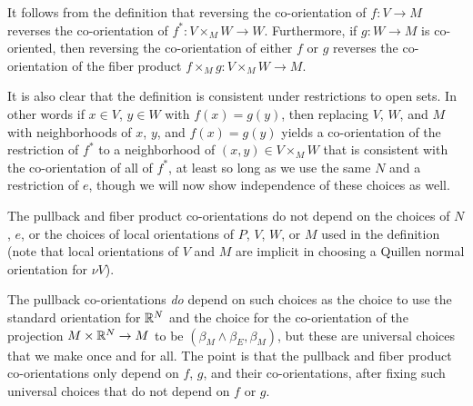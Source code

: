 \begin{remark}\label{R: co-or restriction or switch}
	It follows from the definition that reversing the co-orientation of $f \colon V \to M$ reverses the co-orientation of $f^* \colon V \times_M W \to W$.
	Furthermore, if $g \colon W \to M$ is co-oriented, then reversing the co-orientation of either $f$ or $g$ reverses the co-orientation of the fiber product $f \times_M g \colon V \times_M W \to M$.

	It is also clear that the definition is consistent under restrictions to open sets.
	In other words if $x \in V$, $y \in W$ with $f(x) = g(y)$, then replacing $V$, $W$, and $M$ with neighborhoods of $x$, $y$, and $f(x) = g(y)$ yields a co-orientation of the restriction of $f^*$ to a neighborhood of $(x,y) \in V \times_M W$ that is consistent with the co-orientation of all of $f^*$, at least so long as we use the same $N$ and a restriction of $e$, though we will now show independence of these choices as well.
\end{remark}

\begin{lemma}\label{L: pullback co well defined}
	The pullback and fiber product co-orientations do not depend on the choices of $N$, $e$, or the choices of local orientations of $P$, $V$, $W$, or $M$ used in the definition (note that local orientations of $V$ and $M$ are implicit in choosing a Quillen normal orientation for $\nu V$).
\end{lemma}

\begin{remark}
	The pullback co-orientations \textit{do} depend on such choices as the choice to use the standard orientation for $\mathbb{R}^N$ and the choice for the co-orientation of the projection $M \times \mathbb{R}^N \to M$ to be $(\beta_M \wedge \beta_E, \beta_M)$, but these are universal choices that we make once and for all.
	The point is that the pullback and fiber product co-orientations only depend on $f$, $g$, and their co-orientations, after fixing such universal choices that do not depend on $f$ or $g$.
\end{remark}

\begin{comment}
\greg{I've significantly updated the proof of this lemma. The first part of the proof is the same, but the old ending didn't make sense to me anymore, so I wrote a new ending, split off into its own second lemma below. It makes sense to me, and I think it's correct, but it was hard to get the ideas down concretely. So someone else should read through the whole proof and double check it, both for correctness and perhaps to improve the exposition. One very good thing about the new proof is that it's completely organic here - the old version made a forward reference to the Leibniz formula, whose proof can be taken to be independent to this by using a fixed map $e$, but it wasn't a great way to proceed. On the other hand, there was a certain elegance to using a higher level result instead of the hands-on mucking around that's in the proof now.}
\end{comment}

